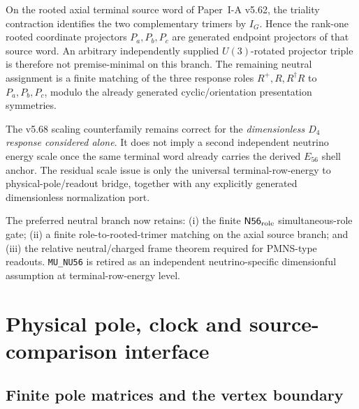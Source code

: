 \documentclass[12pt,a4paper]{article}
\begin{document}
\begin{proposition}
\label{p6:prop:v570-rooted-axial-neutral-frame-narrowing}
On the rooted axial terminal source word of Paper~I-A v5.62, the triality
contraction identifies the two complementary trimers by \(I_G\).  Hence the
rank-one rooted coordinate projectors \(P_a,P_b,P_c\) are generated endpoint
projectors of that source word.  An arbitrary independently supplied
\(U(3)\)-rotated projector triple is therefore not premise-minimal on this
branch.  The remaining neutral assignment is a finite matching of the three
response roles \(R^+,R,R^\dagger R\) to \(P_a,P_b,P_c\), modulo the already
generated cyclic/orientation presentation symmetries.
\end{proposition}

\begin{remark}
\label{p6:rem:v570-scale-nogo-scope}
The v5.68 scaling counterfamily remains correct for the \emph{dimensionless
\(D_4\) response considered alone}.  It does not imply a second independent
neutrino energy scale once the same terminal word already carries the derived
\(E_{56}\) shell anchor.  The residual scale issue is only the universal
terminal-row-energy to physical-pole/readout bridge, together with any
explicitly generated dimensionless normalization port.
\end{remark}

\begin{remark}
\label{p6:rem:v570-updated-neutral-frontier}
The preferred neutral branch now retains: (i) the finite
\(\mathsf{N56}_{\rm role}\) simultaneous-role gate; (ii) a finite
role-to-rooted-trimer matching on the axial source branch; and (iii) the
relative neutral/charged frame theorem required for PMNS-type readouts.
\texttt{MU\_NU56} is retired as an independent neutrino-specific dimensionful
assumption at terminal-row-energy level.
\end{remark}



\section{Physical pole, clock and source-comparison interface}
\label{p5b:sec:organized-physical}
\subsection{Finite pole matrices and the vertex boundary}
\label{p6:sec:pole-matrices}
\end{document}
